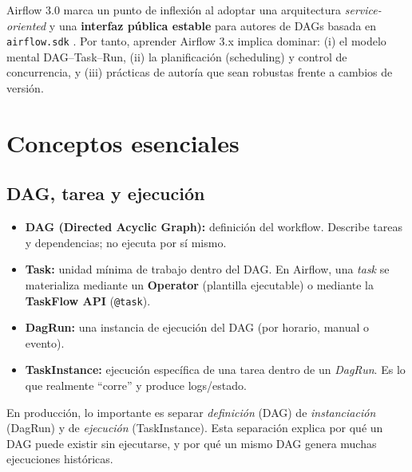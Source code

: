 Airflow 3.0 marca un punto de inflexión al adoptar una arquitectura \textit{service-oriented} y una \textbf{interfaz pública estable} para autores de DAGs basada en \texttt{airflow.sdk} \cite{airflow_release_notes_3,airflow_public_interface}. Por tanto, aprender Airflow 3.x implica dominar: (i) el modelo mental DAG--Task--Run, (ii) la planificación (scheduling) y control de concurrencia, y (iii) prácticas de autoría que sean robustas frente a cambios de versión.

\section{Conceptos esenciales}
\subsection{DAG, tarea y ejecución}
\begin{itemize}[leftmargin=*]
  \item \textbf{DAG (Directed Acyclic Graph):} definición del workflow. Describe tareas y dependencias; no ejecuta por sí mismo.
  \item \textbf{Task:} unidad mínima de trabajo dentro del DAG. En Airflow, una \textit{task} se materializa mediante un \textbf{Operator} (plantilla ejecutable) o mediante la \textbf{TaskFlow API} (\texttt{@task}).
  \item \textbf{DagRun:} una instancia de ejecución del DAG (por horario, manual o evento).
  \item \textbf{TaskInstance:} ejecución específica de una tarea dentro de un \textit{DagRun}. Es lo que realmente ``corre'' y produce logs/estado.
\end{itemize}
En producción, lo importante es separar \textit{definición} (DAG) de \textit{instanciación} (DagRun) y de \textit{ejecución} (TaskInstance). Esta separación explica por qué un DAG puede existir sin ejecutarse, y por qué un mismo DAG genera muchas ejecuciones históricas.

